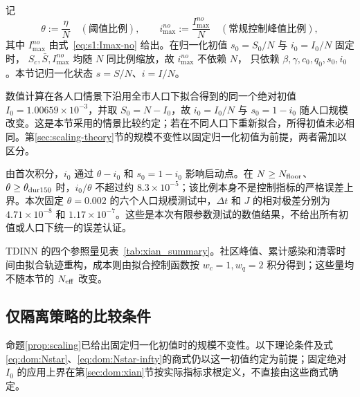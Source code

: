 \documentclass[lang=cn,a4paper,newtx]{elegantpaper}
\numberwithin{equation}{section}
\theoremstyle{plain}
\begin{document}
记
\begin{equation}
  \theta:=\frac{\eta}{N}\quad(\text{阈值比例}),\qquad
  i_{\max}^{no}:=\frac{I_{\max}^{no}}{N}\quad(\text{常规控制峰值比例}),
  \label{eq:dom:ratios}
\end{equation}
其中 $I_{\max}^{no}$ 由式~\eqref{eq:s1:Imax-no} 给出。在归一化初值 $s_0=S_0/N$ 与 $i_0=I_0/N$ 固定时，
$S_c,\bar S,I_{\max}^{no}$ 均随 $N$ 同比例缩放，故 $i_{\max}^{no}$ 不依赖 $N$，
只依赖 $\beta,\gamma,c_0,q_0,s_0,i_0$。本节记归一化状态 $s=S/N$、$i=I/N$。

数值计算在各人口情景下沿用全市人口下拟合得到的同一个绝对初值 $I_0=1.00659\times10^{-3}$，并取 $S_0=N-I_0$，故 $i_0=I_0/N$ 与 $s_0=1-i_0$ 随人口规模改变。这是本节采用的情景比较约定；若在不同人口下重新拟合，所得初值未必相同。第\ref{sec:scaling-theory}节的规模不变性以固定归一化初值为前提，两者需加以区分。

由首次积分，$i_0$ 通过 $\theta-i_0$ 和 $s_0=1-i_0$ 影响启动点。在 $N\ge N_{\rm floor}$、$\theta\ge\theta_{\rm dur150}$ 时，$i_0/\theta$ 不超过约 $8.3\times10^{-5}$；该比例本身不是控制指标的严格误差上界。本次固定 $\theta=0.002$ 的六个人口规模测试中，$\Delta t$ 和 $J$ 的相对极差分别为 $4.71\times10^{-8}$ 和 $1.17\times10^{-7}$。这些是本次有限参数测试的数值结果，不给出所有初值或人口下统一的误差认证。

TDINN 的四个参照量见表~\ref{tab:xian_summary}。社区峰值、累计感染和清零时间由拟合轨迹重构，成本则由拟合控制函数按 $w_c=1,w_q=2$ 积分得到；这些量均不随本节的 $N_{\rm eff}$ 改变。


\subsection{仅隔离策略的比较条件}
\label{sec:dom:theory}
命题\ref{prop:scaling}已给出固定归一化初值时的规模不变性。以下理论条件及式\eqref{eq:dom:Nstar}、\eqref{eq:dom:Nstar-infty}的商式仍以这一初值约定为前提；固定绝对 $I_0$ 的应用上界在第\ref{sec:dom:xian}节按实际指标求根定义，不直接由这些商式确定。
\end{document}
